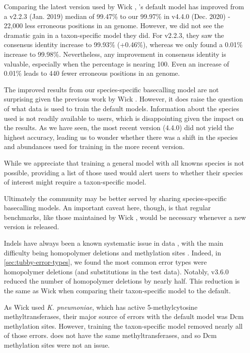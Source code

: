 Comparing the latest version used by Wick \etal{}, \guppy{}'s default model has improved from a v2.2.3 (Jan. 2019) median of 99.47\% to our 99.97\% in v4.4.0 (Dec. 2020) - 22,000 less erroneous positions in an \mtb{} genome. However, we did not see the dramatic gain in a taxon-specific model they did. For \guppy{} v2.2.3, they saw the consensus identity increase to 99.93\% (+0.46\%), whereas we only found a 0.01\% increase to 99.98\%. Nevertheless, any improvement in consensus identity is valuable, especially when the percentage is nearing 100. Even an increase of 0.01\% leads to 440 fewer erroneous positions in an \mtb{} genome.

\noindent
The improved results from our species-specific basecalling model are not surprising given the previous work by Wick \etal{} \cite{wick2019}. However, it does raise the question of what data is used to train the default \guppy{} models. Information about the species used is not readily available to users, which is disappointing given the impact on the results. As we have seen, the most recent \guppy{} version (4.4.0) did not yield the highest accuracy, leading us to wonder whether there was a shift in the species and abundances used for training in the more recent version.

While we appreciate that training a general model with all knowns species is not possible, providing a list of those used would alert users to whether their species of interest might require a taxon-specific model.

Ultimately the \ont{} community may be better served by sharing species-specific basecalling models. An important caveat here, though, is that regular benchmarks, like those maintained by Wick \etal{} \cite{wick2019,wick2020}, would be necessary whenever a new \guppy{} version is released. 

\noindent
Indels have always been a known systematic issue in \ont{} data \cite{watson2019}, with the main difficulty being homopolymer deletions and methylation sites \cite{wick2019,jain2018}. Indeed, in \autoref{sec:tubby-error-types}, we found the most common error types were homopolymer deletions (and substitutions in the test data). Notably, \tubby{} v3.6.0 reduced the number of homopolymer deletions by nearly half. This reduction is the same as Wick \etal{} when comparing their taxon-specific model to the default. 

As Wick \etal{} used \textit{K. pneumoniae}, which has active 5-methylcytosine methyltransferases, their major source of errors with the default \guppy{} model was Dcm methylation sites. However, training the taxon-specific model removed nearly all of those errors. \mtb{} does not have the same methyltransferases, and so Dcm methylation sites were not an issue.

